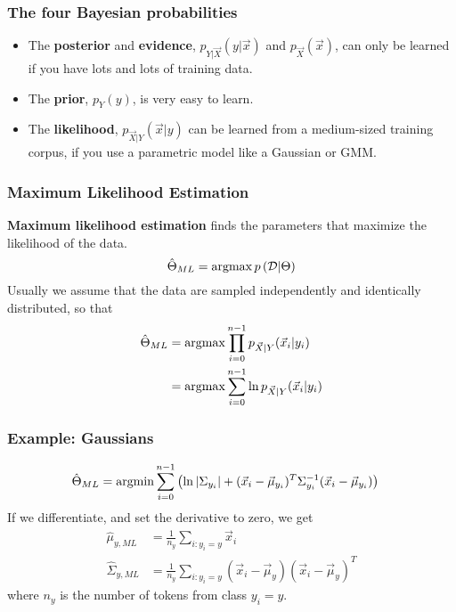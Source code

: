 \documentclass{beamer}
\newcommand{\argmax}{\operatornamewithlimits{argmax}}
\newcommand{\argmin}{\operatornamewithlimits{argmin}}
\begin{document}
\begin{frame}
  \frametitle{The four Bayesian probabilities}

  \begin{itemize}
  \item The {\bf posterior} and {\bf evidence},
    $p_{Y|\vec{X}}(y|\vec{x})$ and $p_{\vec{X}}(\vec{x})$, can only be learned
    if you have lots and lots of training  data.
  \item The {\bf prior}, $p_Y(y)$, is very easy to learn.
  \item The {\bf likelihood}, $p_{\vec{X}|Y}(\vec{x}|y)$ can be learned from a
    medium-sized training corpus, if you use a parametric model like a Gaussian or
    GMM.
  \end{itemize}
\end{frame}


\begin{frame}
  \frametitle{Maximum Likelihood Estimation}

  {\bf Maximum likelihood estimation} finds the parameters that
  maximize the likelihood of the data.
  \begin{displaymath}
    \hat{\Theta}_{ML} = \argmax p\left({\mathcal D}|\Theta\right)
  \end{displaymath}
  Usually we assume that the data are sampled independently and
  identically distributed, so that
  \begin{align*}
    \hat{\Theta}_{ML} &= \argmax \prod_{i=0}^{n-1}p_{\vec{X}|Y}(\vec{x}_i|y_i)\\
    &= \argmax \sum_{i=0}^{n-1}\ln p_{\vec{X}|Y}(\vec{x}_i|y_i)
  \end{align*}
\end{frame}

\begin{frame}
  \frametitle{Example: Gaussians}
  \begin{align*}
    \hat{\Theta}_{ML}
    &= \argmin \sum_{i=0}^{n-1}\left(\ln|\Sigma_{y_i}|
    +(\vec{x}_i-\vec\mu_{y_i})^T\Sigma_{y_i}^{-1}(\vec{x}_i-\vec\mu_{y_i})\right)
  \end{align*}
  If we differentiate, and set the derivative to zero, we get
  \begin{align*}
    \hat\mu_{y,ML} &= \frac{1}{n_y}\sum_{i:y_i=y}\vec{x}_i\\
    \hat\Sigma_{y,ML} &= \frac{1}{n_y}\sum_{i:y_i=y}(\vec{x}_i-\vec\mu_y)(\vec{x}_i-\vec\mu_y)^T
  \end{align*}
  where $n_y$ is the number of tokens from class $y_i=y$.
\end{frame}
\end{document}
